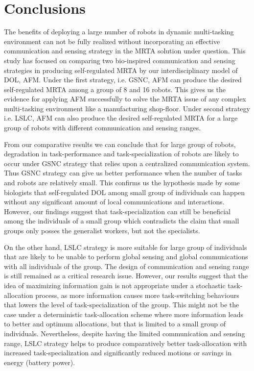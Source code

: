 \chapter{Conclusions}
The benefits of deploying a large number of robots in dynamic multi-tasking environment can not be fully realized without incorporating an effective communication and sensing strategy in the MRTA solution under question.  This study has focused on comparing two bio-inspired  communication and sensing strategies in producing self-regulated MRTA by our interdisciplinary model of DOL, AFM. Under the first strategy, i.e. GSNC, AFM can produce the desired self-regulated MRTA among a group of 8 and 16 robots. This gives us the evidence for applying AFM successfully to solve the MRTA issue of any complex multi-tasking environment like a manufacturing shop-floor. Under second strategy  i.e. LSLC, AFM can also produce the desired self-regulated MRTA for a large group of robots with different communication and sensing ranges. 

From our comparative results we can conclude that for large group of robots,  degradation in  task-performance and task-specialization of robots are likely to occur  under GSNC strategy that relies upon a centralized communication system. Thus GSNC strategy can give us better performance when the number of tasks and robots are relatively small. This confirms us the hypothesis made by some biologists that self-regulated DOL among small group of individuals can happen without any significant amount of local communications and interactions. However, our findings suggest that task-specialization can still be beneficial among the individuals of a small group which contradicts the claim that small groups only posses the generalist workers, but not the specialists.

On the other hand, LSLC strategy is more suitable for large group of individuals that are likely to be unable to perform global sensing and global communications with all individuals of the group. The design of communication and sensing range is still remained as a critical research issue. However, our results suggest that the idea of maximizing information gain is not appropriate under a stochastic task-allocation process, as more information causes more task-switching behaviours that lowers the level of task-specialization of the group. This might not be the case under a deterministic task-allocation scheme where more information leads to better and optimum allocations, but that is limited to a small group of individuals. Nevertheless, despite having the limited communication and sensing range, LSLC strategy helps to produce comparatively better task-allocation with increased task-specialization and significantly reduced motions or savings in energy (battery power).

